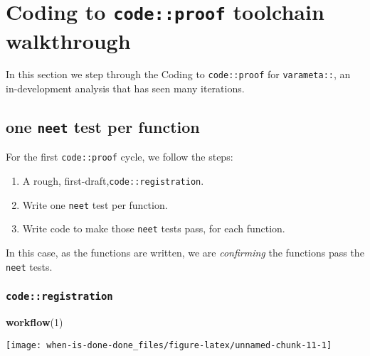 \documentclass[
]{article}
\newenvironment{Shaded}{\begin{snugshade}}{\end{snugshade}}
\newcommand{\DecValTok}[1]{\textcolor[rgb]{0.00,0.00,0.81}{#1}}
\newcommand{\KeywordTok}[1]{\textcolor[rgb]{0.13,0.29,0.53}{\textbf{#1}}}
\newcommand{\NormalTok}[1]{#1}
\providecommand{\tightlist}{%
  \setlength{\itemsep}{0pt}\setlength{\parskip}{0pt}}
\begin{document}
\hypertarget{coding-to-codeproof-toolchain-walkthrough}{%
\section{\texorpdfstring{Coding to \texttt{code::proof} toolchain
walkthrough}{Coding to code::proof toolchain walkthrough}}\label{coding-to-codeproof-toolchain-walkthrough}}

In this section we step through the Coding to \texttt{code::proof} for
\texttt{varameta::}, an in-development analysis that has seen many
iterations.

\hypertarget{one-neet-test-per-function}{%
\subsection{\texorpdfstring{one \texttt{neet} test per
function}{one neet test per function}}\label{one-neet-test-per-function}}

For the first \texttt{code::proof} cycle, we follow the steps:

\begin{enumerate}
\def\labelenumi{\arabic{enumi}.}
\tightlist
\item
  A rough, first-draft,\texttt{code::registration}.
\item
  Write one \texttt{neet} test per function.
\item
  Write code to make those \texttt{neet} tests pass, for each function.
\end{enumerate}

In this case, as the functions are written, we are \emph{confirming} the
functions pass the \texttt{neet} tests.

\hypertarget{coderegistration-1}{%
\subsubsection{\texorpdfstring{\texttt{code::registration}}{code::registration}}\label{coderegistration-1}}

\begin{Shaded}
\begin{Highlighting}[]
\KeywordTok{workflow}\NormalTok{(}\DecValTok{1}\NormalTok{)}
\end{Highlighting}
\end{Shaded}

\begin{center}\texttt{[image: when-is-done-done\_files/figure-latex/unnamed-chunk-11-1]} \end{center}
\end{document}
